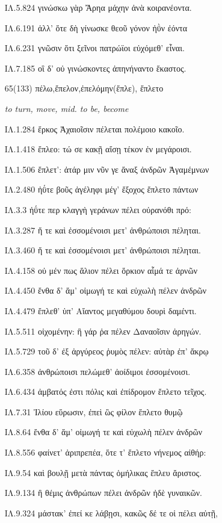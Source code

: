 \begin{enumerate}
{ΙΛ.5.824 γινώσκω γὰρ Ἄρηα μάχην ἀνὰ κοιρανέοντα. 

ΙΛ.6.191 ἀλλ' ὅτε δὴ γίνωσκε θεοῦ γόνον ἠῢν ἐόντα 

ΙΛ.6.231 γνῶσιν ὅτι ξεῖνοι πατρώϊοι εὐχόμεθ' εἶναι. 

ΙΛ.7.185 οἳ δ' οὐ γινώσκοντες ἀπηνήναντο ἕκαστος. 

}

\clearpage
\item[\large 65(133)]{\large \g πέλω,ἔπελον,ἐπελόμην(ἔπλε), ἔπλετο}

\hspace{0.2cm} \textit{  to turn, move, mid. to be, become}

{\g
ΙΛ.1.284 ἕρκος Ἀχαιοῖσιν πέλεται πολέμοιο κακοῖο. 

ΙΛ.1.418 ἔπλεο: τώ σε κακῇ αἴσῃ τέκον ἐν μεγάροισι. 

ΙΛ.1.506 ἔπλετ': ἀτάρ μιν νῦν γε ἄναξ ἀνδρῶν Ἀγαμέμνων 

ΙΛ.2.480 ἠΰτε βοῦς ἀγέληφι μέγ' ἔξοχος ἔπλετο πάντων 

ΙΛ.3.3 ἠΰτε περ κλαγγὴ γεράνων πέλει οὐρανόθι πρό: 

ΙΛ.3.287 ἥ τε καὶ ἐσσομένοισι μετ' ἀνθρώποισι πέληται. 

ΙΛ.3.460 ἥ τε καὶ ἐσσομένοισι μετ' ἀνθρώποισι πέληται. 

ΙΛ.4.158 οὐ μέν πως ἅλιον πέλει ὅρκιον αἷμά τε ἀρνῶν 

ΙΛ.4.450 ἔνθα δ' ἅμ' οἰμωγή τε καὶ εὐχωλὴ πέλεν ἀνδρῶν 

ΙΛ.4.479 ἔπλεθ' ὑπ' Αἴαντος μεγαθύμου δουρὶ δαμέντι. 

ΙΛ.5.511 οἰχομένην: ἣ γάρ ῥα πέλεν Δαναοῖσιν ἀρηγών. 

ΙΛ.5.729 τοῦ δ' ἐξ ἀργύρεος ῥυμὸς πέλεν: αὐτὰρ ἐπ' ἄκρῳ 

ΙΛ.6.358 ἀνθρώποισι πελώμεθ' ἀοίδιμοι ἐσσομένοισι. 

ΙΛ.6.434 ἀμβατός ἐστι πόλις καὶ ἐπίδρομον ἔπλετο τεῖχος. 

ΙΛ.7.31 Ἰλίου εὕρωσιν, ἐπεὶ ὣς φίλον ἔπλετο θυμῷ 

ΙΛ.8.64 ἔνθα δ' ἅμ' οἰμωγή τε καὶ εὐχωλὴ πέλεν ἀνδρῶν 

ΙΛ.8.556 φαίνετ' ἀριπρεπέα, ὅτε τ' ἔπλετο νήνεμος αἰθήρ: 

ΙΛ.9.54 καὶ βουλῇ μετὰ πάντας ὁμήλικας ἔπλευ ἄριστος. 

ΙΛ.9.134 ἣ θέμις ἀνθρώπων πέλει ἀνδρῶν ἠδὲ γυναικῶν. 

ΙΛ.9.324 μάστακ' ἐπεί κε λάβῃσι, κακῶς δέ τε οἱ πέλει αὐτῇ, 

}
\end{enumerate}
